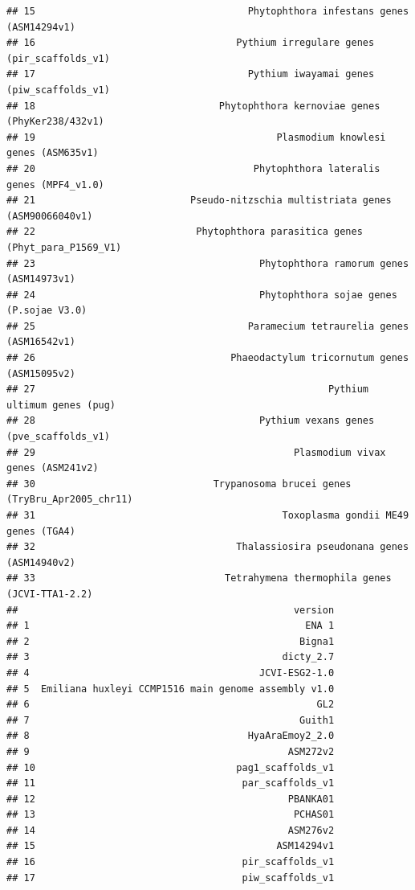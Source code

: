 \documentclass[
]{book}
\begin{document}
\begin{verbatim}
## 15                                     Phytophthora infestans genes (ASM14294v1)
## 16                                   Pythium irregulare genes (pir_scaffolds_v1)
## 17                                     Pythium iwayamai genes (piw_scaffolds_v1)
## 18                                Phytophthora kernoviae genes (PhyKer238/432v1)
## 19                                          Plasmodium knowlesi genes (ASM635v1)
## 20                                      Phytophthora lateralis genes (MPF4_v1.0)
## 21                           Pseudo-nitzschia multistriata genes (ASM90066040v1)
## 22                            Phytophthora parasitica genes (Phyt_para_P1569_V1)
## 23                                       Phytophthora ramorum genes (ASM14973v1)
## 24                                       Phytophthora sojae genes (P.sojae V3.0)
## 25                                     Paramecium tetraurelia genes (ASM16542v1)
## 26                                  Phaeodactylum tricornutum genes (ASM15095v2)
## 27                                                   Pythium ultimum genes (pug)
## 28                                       Pythium vexans genes (pve_scaffolds_v1)
## 29                                             Plasmodium vivax genes (ASM241v2)
## 30                               Trypanosoma brucei genes (TryBru_Apr2005_chr11)
## 31                                           Toxoplasma gondii ME49 genes (TGA4)
## 32                                   Thalassiosira pseudonana genes (ASM14940v2)
## 33                                 Tetrahymena thermophila genes (JCVI-TTA1-2.2)
##                                                version
## 1                                                ENA 1
## 2                                               Bigna1
## 3                                            dicty_2.7
## 4                                        JCVI-ESG2-1.0
## 5  Emiliana huxleyi CCMP1516 main genome assembly v1.0
## 6                                                  GL2
## 7                                               Guith1
## 8                                      HyaAraEmoy2_2.0
## 9                                             ASM272v2
## 10                                   pag1_scaffolds_v1
## 11                                    par_scaffolds_v1
## 12                                            PBANKA01
## 13                                             PCHAS01
## 14                                            ASM276v2
## 15                                          ASM14294v1
## 16                                    pir_scaffolds_v1
## 17                                    piw_scaffolds_v1

\end{verbatim}
\end{document}
